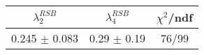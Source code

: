 \begin{tabular}{c|c||c}
$\lambda_{2}^{RSB}$ & $\lambda_4^{RSB}$ & $\chi^{2}$/ndf \\
\hline
0.245 $\pm$ 0.083 & 0.29 $\pm$ 0.19 & 76/99\\
\end{tabular}

